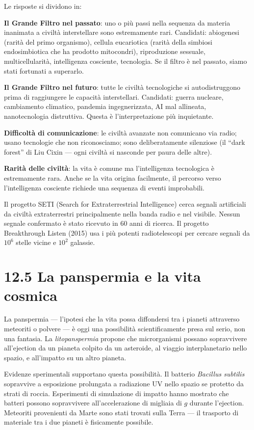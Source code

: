 \documentclass[11.5pt,a4paper,openany]{book}
\theoremstyle{remark}
\begin{document}
Le risposte si dividono in:

\textbf{Il Grande Filtro nel passato}: uno o più passi nella sequenza da materia inanimata a civiltà interstellare sono estremamente rari. Candidati: abiogenesi (rarità del primo organismo), cellula eucariotica (rarità della simbiosi endosimbiotica che ha prodotto mitocondri), riproduzione sessuale, multicellularità, intelligenza cosciente, tecnologia. Se il filtro è nel passato, siamo stati fortunati a superarlo.

\textbf{Il Grande Filtro nel futuro}: tutte le civiltà tecnologiche si autodistruggono prima di raggiungere le capacità interstellari. Candidati: guerra nucleare, cambiamento climatico, pandemia ingegnerizzata, AI mal allineata, nanotecnologia distruttiva. Questa è l'interpretazione più inquietante.

\textbf{Difficoltà di comunicazione}: le civiltà avanzate non comunicano via radio; usano tecnologie che non riconosciamo; sono deliberatamente silenziose (il ``dark forest'' di Liu Cixin --- ogni civiltà si nasconde per paura delle altre).

\textbf{Rarità delle civiltà}: la vita è comune ma l'intelligenza tecnologica è estremamente rara. Anche se la vita origina facilmente, il percorso verso l'intelligenza cosciente richiede una sequenza di eventi improbabili.

Il progetto SETI (Search for Extraterrestrial Intelligence) cerca segnali artificiali da civiltà extraterrestri principalmente nella banda radio e nel visibile. Nessun segnale confermato è stato ricevuto in 60 anni di ricerca. Il progetto Breakthrough Listen (2015) usa i più potenti radiotelescopi per cercare segnali da $10^6$ stelle vicine e $10^2$ galassie.

\section{12.5 La panspermia e la vita cosmica}

La panspermia --- l'ipotesi che la vita possa diffondersi tra i pianeti attraverso meteoriti o polvere --- è oggi una possibilità scientificamente presa sul serio, non una fantasia. La \textit{litopanspermia} propone che microrganismi possano sopravvivere all'ejection da un pianeta colpito da un asteroide, al viaggio interplanetario nello spazio, e all'impatto su un altro pianeta.

Evidenze sperimentali supportano questa possibilità. Il batterio \textit{Bacillus subtilis} sopravvive a esposizione prolungata a radiazione UV nello spazio se protetto da strati di roccia. Esperimenti di simulazione di impatto hanno mostrato che batteri possono sopravvivere all'accelerazione di migliaia di $g$ durante l'ejection. Meteoriti provenienti da Marte sono stati trovati sulla Terra --- il trasporto di materiale tra i due pianeti è fisicamente possibile.
\end{document}
